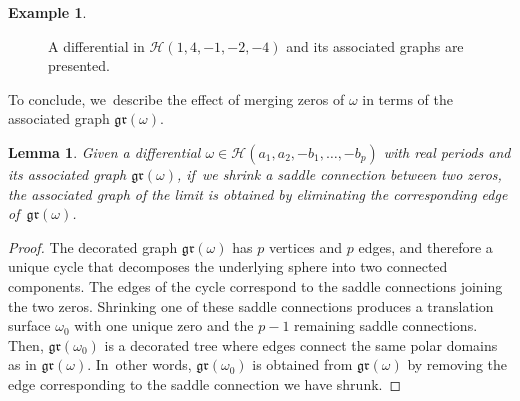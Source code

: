 \documentclass[JEP,XML,SOM,Unicode,NoFloatCountersInSection,published]{cedram}
\newtheorem{lem}[thm]{Lemma}
\theoremstyle{definition}
\newtheorem{ex}[thm]{Example}
\begin{document}
\begin{ex}
\begin{figure}[ht]
\caption{A differential in $\mathcal{H}(1,4,-1,-2,-4)$ and its associated graphs are presented.} \label{fig:exgraph2}
\end{figure}
\end{ex}

To conclude, we~describe the effect of merging zeros of $\omega$ in terms of the associated graph $\mathfrak{gr}(\omega)$.
\begin{lem}\label{lem:defengraph}
Given a differential $\omega\in\mathcal{H}(a_{1},a_{2},-b_{1},\dots,-b_{p})$ with real periods and its associated graph $\mathfrak{gr}(\omega)$, if~we shrink a saddle connection between two zeros, the associated graph of the limit is obtained by eliminating the corresponding edge of~$\mathfrak{gr}(\omega)$.
\end{lem}

\begin{proof}
The decorated graph $\mathfrak{gr}(\omega)$ has $p$ vertices and $p$ edges, and therefore a unique cycle that decomposes the underlying sphere into two connected components. The edges of the cycle correspond to the saddle connections joining the two zeros. Shrinking one of these saddle connections produces a translation surface $\omega_{0}$ with one unique zero and the $p-1$ remaining saddle connections. Then, $\mathfrak{gr}(\omega_{0})$ is a decorated tree where edges connect the same polar domains as in $\mathfrak{gr}(\omega)$. In~other words, $\mathfrak{gr}(\omega_{0})$ is obtained from $\mathfrak{gr}(\omega)$ by removing the edge corresponding to the saddle connection we have shrunk.
\end{proof}
\end{document}
